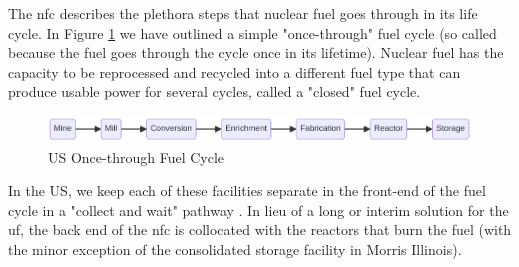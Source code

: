 The \gls{nfc} describes the plethora steps that nuclear fuel goes through
in its life cycle. In Figure \ref{fig:once-through} we have outlined a
simple "once-through" fuel cycle (so called because the fuel goes through
the cycle once in its lifetime). Nuclear fuel has the capacity to be
reprocessed and recycled into a different fuel type that can produce
usable power for several cycles, called a "closed" fuel cycle.

\begin{figure}[h]
    \centering
    \includegraphics[scale=0.45]{images/once_through_fc.png}
    \caption{US Once-through Fuel Cycle}
    \label{fig:once-through}
\end{figure}

 In the US, we keep each of these facilities separate in the front-end of
 the fuel cycle in a "collect and wait" pathway \cite{cycle_risks}. In
 lieu of a long or interim solution for the \gls{uf}, the back end of the
 \gls{nfc} is collocated with the reactors that burn the fuel (with the
 minor exception of the consolidated storage facility in Morris Illinois).
